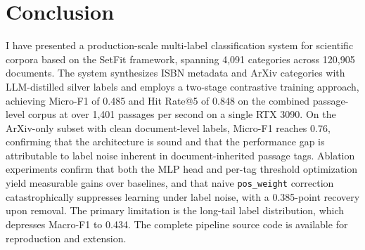 \documentclass[10pt,journal,compsoc]{IEEEtran}
\newcommand{\TotalDocs}{120,905}
\newcommand{\NumTags}{4,091}
\newcommand{\MicroF}{0.485}
\newcommand{\MacroF}{0.434}
\newcommand{\Throughput}{1,401}
\newcommand{\ArXivMicroF}{0.76}
\newcommand{\PosWeightDelta}{0.385}
\newcommand{\HitRateFive}{0.848}
\begin{document}
	\section{Conclusion}
	I have presented a production-scale multi-label classification system for scientific corpora based on the SetFit framework, spanning \NumTags{} categories across \TotalDocs{} documents. The system synthesizes ISBN metadata and ArXiv categories with LLM-distilled silver labels and employs a two-stage contrastive training approach, achieving Micro-F1 of \MicroF{} and Hit Rate@5 of \HitRateFive{} on the combined passage-level corpus at over \Throughput{} passages per second on a single RTX 3090. On the ArXiv-only subset with clean document-level labels, Micro-F1 reaches \ArXivMicroF{}, confirming that the architecture is sound and that the performance gap is attributable to label noise inherent in document-inherited passage tags. Ablation experiments confirm that both the MLP head and per-tag threshold optimization yield measurable gains over baselines, and that naive \texttt{pos\_weight} correction catastrophically suppresses learning under label noise, with a \PosWeightDelta{}-point recovery upon removal. The primary limitation is the long-tail label distribution, which depresses Macro-F1 to \MacroF{}. The complete pipeline source code is available for reproduction and extension.
	
\end{document}
